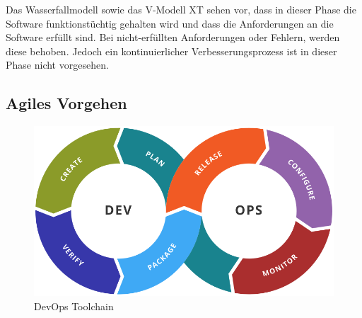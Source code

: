 	Das Wasserfallmodell \cite{ASimulationModelWaterfallSoftware} sowie das V-Modell XT \cite{WaterfallVsVModelVsAgile} sehen vor, dass in dieser Phase die Software funktionstüchtig gehalten wird und dass die Anforderungen an die Software erfüllt sind. Bei nicht-erfüllten Anforderungen oder Fehlern, werden diese behoben. Jedoch ein kontinuierlicher Verbesserungsprozess ist in dieser Phase nicht vorgesehen.
	
%	

\subsection{Agiles Vorgehen}

	\begin{figure}
		\centering
		\vspace{-\baselineskip}
		\includegraphics[width=\linewidth]{img/02_theorie/devops-life-cycle.png}
		\caption{DevOps Toolchain}
		\label{fig:devops-life-cycle}
	\end{figure}
	
